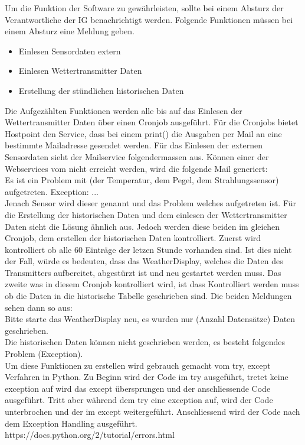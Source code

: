 Um die Funktion der Software zu gewährleisten, sollte bei einem Absturz der Verantwortliche der IG benachrichtigt werden. Folgende Funktionen müssen bei einem Absturz eine Meldung geben.
\begin{itemize}
\item Einlesen Sensordaten extern
\item Einlesen Wettertransmitter Daten
\item Erstellung der stündlichen historischen Daten
\end{itemize}
Die Aufgezählten Funktionen werden alle bis auf das Einlesen der Wettertransmitter Daten über einen Cronjob ausgeführt. Für die Cronjobs bietet Hostpoint den Service, dass bei einem print() die Ausgaben per Mail an eine bestimmte Mailadresse gesendet werden. Für das Einlesen der externen Sensordaten sieht der Mailservice folgendermassen aus. Können einer der Webservices vom  nicht erreicht werden, wird die folgende Mail generiert:\\
Es ist ein Problem mit (der Temperatur, dem Pegel, dem Strahlungssensor) aufgetreten. Exception: ...\\
Jenach Sensor wird dieser genannt und das Problem welches aufgetreten ist. Für die Erstellung der historischen Daten und dem einlesen der Wettertransmitter Daten sieht die Lösung ähnlich aus. Jedoch werden diese beiden im gleichen Cronjob, dem erstellen der historischen Daten kontrolliert. Zuerst wird kontrolliert ob alle 60 Einträge der letzen Stunde vorhanden sind. Ist dies nicht der Fall, würde es bedeuten, dass das WeatherDisplay, welches die Daten des Transmitters aufbereitet, abgestürzt ist und neu gestartet werden muss. Das zweite was in diesem Cronjob kontrolliert wird, ist dass Kontrolliert werden muss ob die Daten in die historische Tabelle geschrieben sind. Die beiden Meldungen sehen dann so aus:\\
Bitte starte das WeatherDisplay neu, es wurden nur (Anzahl Datensätze) Daten geschrieben.\\
Die historischen Daten können nicht geschrieben werden, es besteht folgendes Problem (Exception).\\

Um diese Funktionen zu erstellen wird gebrauch gemacht vom try, except Verfahren in Python. Zu Beginn wird der Code im try ausgeführt, tretet keine exception auf wird das except übersprungen und der anschliessende Code ausgeführt. Tritt aber während dem try eine exception auf, wird der Code unterbrochen und der im except weitergeführt. Anschliessend wird der Code nach dem Exception Handling ausgeführt.
https://docs.python.org/2/tutorial/errors.html
